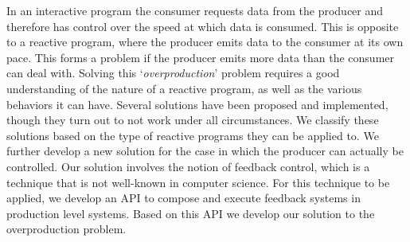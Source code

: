 In an interactive program the consumer requests data from the producer and therefore has control over the speed at which data is consumed. This is opposite to a reactive program, where the producer emits data to the consumer at its own pace. This forms a problem if the producer emits more data than the consumer can deal with. Solving this `\textit{overproduction}' problem requires a good understanding of the nature of a reactive program, as well as the various behaviors it can have. Several solutions have been proposed and implemented, though they turn out to not work under all circumstances. We classify these solutions based on the type of reactive programs they can be applied to. We further develop a new solution for the case in which the producer can actually be controlled. Our solution involves the notion of feedback control, which is a technique that is not well-known in computer science. For this technique to be applied, we develop an API to compose and execute feedback systems in production level systems. Based on this API we develop our solution to the overproduction problem.
